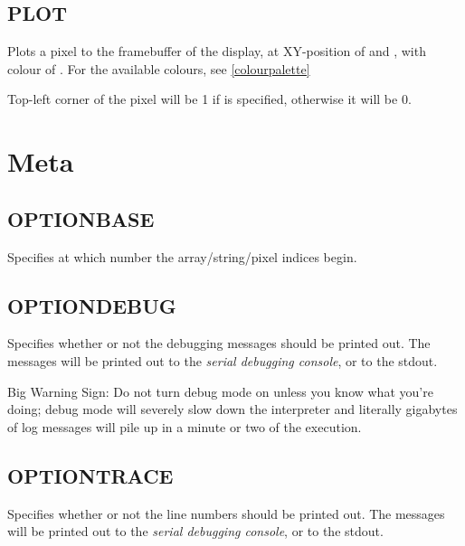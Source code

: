     \subsection{PLOT}
        \par
        Plots a pixel to the framebuffer of the display, at XY-position of  and , with colour of . For the available colours, see \ref{colourpalette}\par
        Top-left corner of the pixel will be 1 if  is specified, otherwise it will be 0.

\section{Meta}

    \subsection{OPTIONBASE}
        \par
        Specifies at which number the array/string/pixel indices begin.
    \subsection{OPTIONDEBUG}
        \par
        Specifies whether or not the debugging messages should be printed out. The messages will be printed out to the \emph{serial debugging console}, or to the stdout.\par
        {\LARGE Big Warning Sign:} Do not turn debug mode on unless you know what you're doing; debug mode will severely slow down the interpreter and literally gigabytes of log messages will pile up in a minute or two of the execution.
    \subsection{OPTIONTRACE}
        \par
        Specifies whether or not the line numbers should be printed out. The messages will be printed out to the \emph{serial debugging console}, or to the stdout.
